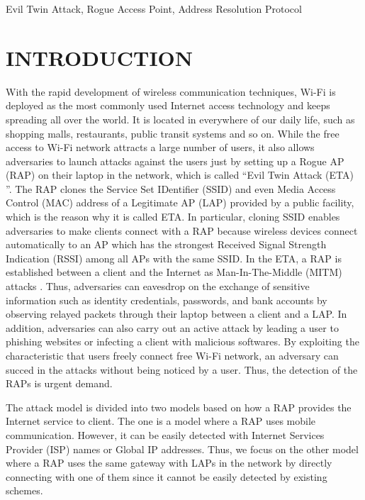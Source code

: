 \documentclass[conference]{IEEEtran}
\begin{document}
\begin{IEEEkeywords}
Evil Twin Attack, Rogue Access Point, Address Resolution Protocol
\end{IEEEkeywords}

\section{INTRODUCTION}
With the rapid development of wireless communication techniques, Wi-Fi is deployed as the most commonly used Internet access technology and keeps spreading all over the world\cite{bg-evi}.
It is located in everywhere of our daily life, such as shopping malls, restaurants, public transit systems and so on.
While the free access to Wi-Fi network attracts a large number of users, it also allows adversaries to launch attacks against the users just by setting up a Rogue AP (RAP) on their laptop in the network, which is called ``Evil Twin Attack (ETA) ''\cite{laptop-evi}.
The RAP clones the Service Set IDentifier (SSID) and even Media Access Control (MAC) address of a Legitimate AP (LAP) provided by a public facility, which is the reason why it is called ETA.
In particular, cloning SSID enables adversaries to make clients connect with a RAP because wireless devices connect automatically to an AP which has the strongest Received Signal Strength Indication (RSSI) among all APs with the same SSID.
In the ETA, a RAP is established between a client and the Internet as Man-In-The-Middle (MITM) attacks \cite{spoof-evi}.
Thus, adversaries can eavesdrop on the exchange of sensitive information such as identity credentials, passwords, and bank accounts by observing relayed packets through their laptop between a client and a LAP.
In addition, adversaries can also carry out an active attack by leading a user to phishing websites or infecting a client with malicious softwares\cite{research}.
By exploiting the characteristic that users freely connect free Wi-Fi network,  an adversary can succed in the attacks without being noticed by a user.
Thus, the detection of the RAPs is urgent demand.

The attack model is divided into two models based on how a RAP provides the Internet service to client.
The one is a model where a RAP uses mobile communication.
However, it can be easily detected with Internet Services Provider (ISP) names or Global IP addresses\cite{rtt}.
Thus, we focus on the other model where a RAP uses the same gateway with LAPs in the network by directly connecting with one of them since it cannot be easily detected by existing schemes.
\end{document}
